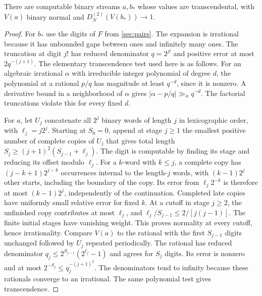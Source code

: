 \documentclass[11pt]{article}
\begin{document}
\begin{proposition}\label{prop:endpoints}
There are computable binary streams \(a,b_*\) whose values are transcendental, with \(V(a)\) binary normal and \(D_N^{(2)}(V(b_*))\to1\).
\end{proposition}
\begin{proof}
For \(b_*\) use the digits of \(F\) from \cref{sec:pairs}. The expansion is irrational because it has unbounded gaps between ones and infinitely many ones. The truncation at digit \(j!\) has reduced denominator \(q=2^{j!}\) and positive error at most \(2q^{-(j+1)}\). The elementary transcendence test used here is as follows. For an algebraic irrational \(\alpha\) with irreducible integer polynomial of degree \(d\), the polynomial at a rational \(p/q\) has magnitude at least \(q^{-d}\), since it is nonzero. A derivative bound in a neighborhood of \(\alpha\) gives \(|\alpha-p/q|\gg_\alpha q^{-d}\). The factorial truncations violate this for every fixed \(d\).

For \(a\), let \(U_j\) concatenate all \(2^j\) binary words of length \(j\) in lexicographic order, with \(\ell_j=j2^j\). Starting at \(S_0=0\), append at stage \(j\ge1\) the smallest positive number of complete copies of \(U_j\) that gives total length \(S_j\ge(j+1)^2(S_{j-1}+\ell_j)\). The digit is computable by finding its stage and reducing its offset modulo \(\ell_j\). For a \(k\)-word with \(k\le j\), a complete copy has \((j-k+1)2^{j-k}\) occurrences internal to the length-\(j\) words, with \((k-1)2^j\) other starts, including the boundary of the copy. Its error from \(\ell_j2^{-k}\) is therefore at most \((k-1)2^j\), independently of the continuation. Completed late copies have uniformly small relative error for fixed \(k\). At a cutoff in stage \(j\ge2\), the unfinished copy contributes at most \(\ell_j\), and \(\ell_j/S_{j-1}\le 2/[j(j-1)]\). The finite initial stages have vanishing weight. This proves normality at every cutoff, hence irrationality. Compare \(V(a)\) to the rational with the first \(S_{j-1}\) digits unchanged followed by \(U_j\) repeated periodically. The rational has reduced denominator \(q_j\le2^{S_{j-1}}(2^{\ell_j}-1)\) and agrees for \(S_j\) digits. Its error is nonzero and at most \(2^{-S_j}\le q_j^{-(j+1)^2}\). The denominators tend to infinity because these rationals converge to an irrational. The same polynomial test gives transcendence.
\end{proof}
\end{document}
